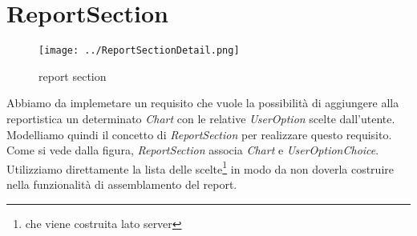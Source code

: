 \section{ReportSection}
\label{sec:reportSection}

\begin{figure}[h!] 
	\centering
	\texttt{[image: ../ReportSectionDetail.png]}
	\caption{report section}
	\label{fig:reportSection} 
\end{figure}

Abbiamo da implemetare un requisito che vuole la possibilit\`a di aggiungere
alla reportistica un determinato \emph{Chart} con le relative \emph{UserOption}
scelte dall'utente. Modelliamo quindi il concetto di \emph{ReportSection} per
realizzare questo requisito. Come si vede dalla figura, \emph{ReportSection}
associa \emph{Chart} e \emph{UserOptionChoice}. Utilizziamo direttamente la
lista delle scelte\footnote{che viene costruita lato server} in modo da non
doverla costruire nella funzionalit\`a di assemblamento del report.
